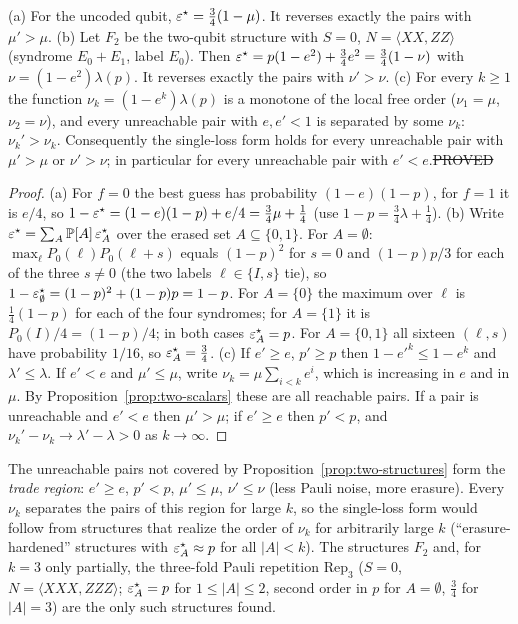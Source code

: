 \begin{proposition}\label{prop:two-structures}
(a) For the uncoded qubit, $\varepsilon^{\star}=\tfrac34(1-\mu)$. It reverses exactly the pairs with $\mu'>\mu$.
(b) Let $F_2$ be the two-qubit structure with $S=0$, $N=\langle XX,ZZ\rangle$ (syndrome $E_0+E_1$, label $E_0$). Then $\varepsilon^{\star}=p(1-e^2)+\tfrac34e^2=\tfrac34(1-\nu)$ with $\nu=(1-e^2)\lambda(p)$. It reverses exactly the pairs with $\nu'>\nu$.
(c) For every $k\ge1$ the function $\nu_k=(1-e^k)\lambda(p)$ is a monotone of the local free order ($\nu_1=\mu$, $\nu_2=\nu$), and every unreachable pair with $e,e'<1$ is separated by some $\nu_k$: $\nu_k'>\nu_k$.
Consequently the single-loss form holds for every unreachable pair with $\mu'>\mu$ or $\nu'>\nu$; in particular for every unreachable pair with $e'<e$.\hfill\st{PROVED}
\end{proposition}
\begin{proof}
(a) For $f=0$ the best guess has probability $(1-e)(1-p)$, for $f=1$ it is $e/4$, so $1-\varepsilon^{\star}=(1-e)(1-p)+e/4=\tfrac34\mu+\tfrac14$ (use $1-p=\tfrac34\lambda+\tfrac14$).
(b) Write $\varepsilon^{\star}=\sum_A\mathbb{P}[A]\,\varepsilon^{\star}_A$ over the erased set $A\subseteq\{0,1\}$. For $A=\emptyset$: $\max_\ell P_0(\ell)P_0(\ell+s)$ equals $(1-p)^2$ for $s=0$ and $(1-p)p/3$ for each of the three $s\ne0$ (the two labels $\ell\in\{I,s\}$ tie), so $1-\varepsilon^{\star}_\emptyset=(1-p)^2+(1-p)p=1-p$.
For $A=\{0\}$ the maximum over $\ell$ is $\tfrac14(1-p)$ for each of the four syndromes; for $A=\{1\}$ it is $P_0(I)/4=(1-p)/4$; in both cases $\varepsilon^{\star}_A=p$. For $A=\{0,1\}$ all sixteen $(\ell,s)$ have probability $1/16$, so $\varepsilon^{\star}_A=\tfrac34$.
(c) If $e'\ge e$, $p'\ge p$ then $1-e'^k\le1-e^k$ and $\lambda'\le\lambda$. If $e'<e$ and $\mu'\le\mu$, write $\nu_k=\mu\sum_{i<k}e^i$, which is increasing in $e$ and in $\mu$. By Proposition~\ref{prop:two-scalars} these are all reachable pairs. If a pair is unreachable and $e'<e$ then $\mu'>\mu$; if $e'\ge e$ then $p'<p$, and $\nu_k'-\nu_k\to\lambda'-\lambda>0$ as $k\to\infty$.
\end{proof}

The unreachable pairs not covered by Proposition~\ref{prop:two-structures} form the \emph{trade region}: $e'\ge e$, $p'<p$, $\mu'\le\mu$, $\nu'\le\nu$ (less Pauli noise, more erasure). Every $\nu_k$ separates the pairs of this region for large $k$, so the single-loss form would follow from structures that realize the order of $\nu_k$ for arbitrarily large $k$ (``erasure-hardened'' structures with $\varepsilon^{\star}_A\approx p$ for all $|A|<k$). The structures $F_2$ and, for $k=3$ only partially, the three-fold Pauli repetition $\mathrm{Rep}_3$ ($S=0$, $N=\langle XXX,ZZZ\rangle$; $\varepsilon^{\star}_A=p$ for $1\le|A|\le2$, second order in $p$ for $A=\emptyset$, $\tfrac34$ for $|A|=3$) are the only such structures found.


